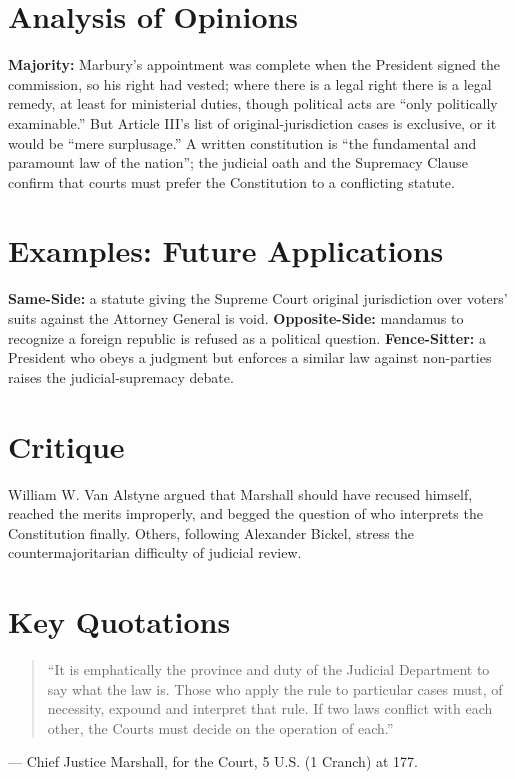 \documentclass[12pt]{article}
\begin{document}
\section{Analysis of Opinions}
\textbf{Majority:} Marbury's appointment was complete when the President signed the commission, so his right had vested; where there is a legal right there is a legal remedy, at least for ministerial duties, though political acts are ``only politically examinable.'' But Article III's list of original-jurisdiction cases is exclusive, or it would be ``mere surplusage.'' A written constitution is ``the fundamental and paramount law of the nation''; the judicial oath and the Supremacy Clause confirm that courts must prefer the Constitution to a conflicting statute.

\section{Examples: Future Applications}
\textbf{Same-Side:} a statute giving the Supreme Court original jurisdiction over voters' suits against the Attorney General is void. \textbf{Opposite-Side:} mandamus to recognize a foreign republic is refused as a political question. \textbf{Fence-Sitter:} a President who obeys a judgment but enforces a similar law against non-parties raises the judicial-supremacy debate.

\section{Critique}
William W. Van Alstyne argued that Marshall should have recused himself, reached the merits improperly, and begged the question of who interprets the Constitution finally. Others, following Alexander Bickel, stress the countermajoritarian difficulty of judicial review.

\section{Key Quotations}
\begin{quote}
``It is emphatically the province and duty of the Judicial Department to say what the law is. Those who apply the rule to particular cases must, of necessity, expound and interpret that rule. If two laws conflict with each other, the Courts must decide on the operation of each.''
\end{quote}
\noindent --- Chief Justice Marshall, for the Court, 5 U.S. (1 Cranch) at 177.
\end{document}
